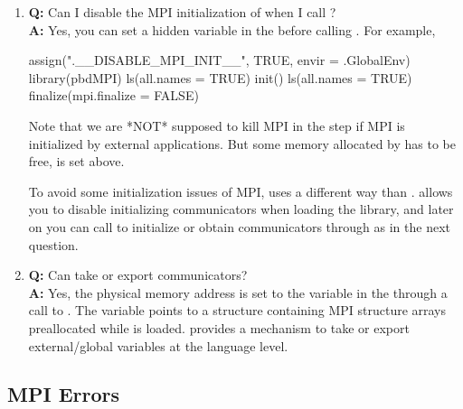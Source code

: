 \begin{enumerate}
\item {\bf\color{blue} Q:}
      Can I disable the MPI initialization of  when I call
      ? \\
      {\bf\color{blue} A:}
      Yes, you can set a hidden variable  in the
       before calling .
      For example,
\begin{Code}[title=SPMD R Script]
assign(".__DISABLE_MPI_INIT__", TRUE, envir = .GlobalEnv)
library(pbdMPI)
ls(all.names = TRUE)
init()
ls(all.names = TRUE)
finalize(mpi.finalize = FALSE)
\end{Code}
      Note that we are *NOT* supposed to kill MPI in the  step
      if MPI is initialized by external applications. But some memory allocated
      by  has to be free,  is set above.

      To avoid some initialization issues of MPI,  uses a
      different way than .  allows you to disable
      initializing communicators when loading the library, and later on you can
      call  to initialize or obtain communicators through
       as in the next question.

\item {\bf\color{blue} Q:}
      Can  take or export communicators? \\
      {\bf\color{blue} A:}
      Yes, the physical memory address is set to the variable
       in the  through a call to
      . The variable points to a structure containing MPI
      structure arrays preallocated while  is loaded.
       provides a mechanism to take or export
      external/global variables at the  language level.

\end{enumerate}




\subsection[MPI Errors]{MPI Errors}
\label{sec:mpi_errors}


